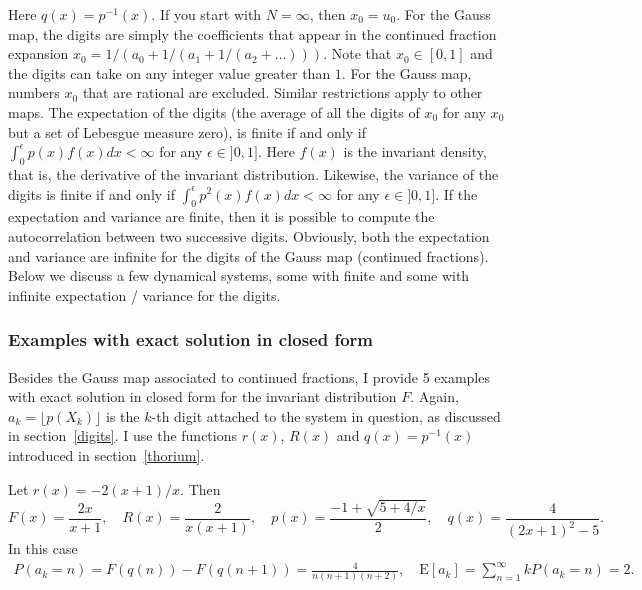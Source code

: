\documentclass[oneside,10pt]{book}
\begin{document}
Here $q(x)=p^{-1}(x)$. If you start with $N=\infty$, then $x_0=u_0$. For the \textcolor{index}{Gauss map}, the digits are simply the coefficients that appear in the continued fraction expansion $x_0=1/(a_0+1/(a_1+1/(a_2+\dots)))$. Note that $x_0\in[0,1]$ and the digits can take on any integer value greater than $1$. For the Gauss map, numbers $x_0$ that are rational are excluded. Similar restrictions apply to other maps. The expectation of the digits (the average of all the digits of $x_0$ for any $x_0$ but a set of Lebesgue measure zero), is finite if and only if $\int_0^\epsilon p(x)f(x)dx<\infty$ for any $\epsilon\in ]0,1]$. Here $f(x)$ is the invariant density, that is, the derivative of the invariant distribution. Likewise, the variance of the digits is finite if and only if $\int_0^\epsilon p^2(x)f(x)dx<\infty$ for any $\epsilon\in ]0,1]$. If the expectation and variance are finite, then it is possible to compute the autocorrelation between two successive digits. Obviously, both the expectation and variance are infinite for the digits of the Gauss map (continued fractions). Below we discuss a few dynamical systems, some with finite and some with infinite expectation / variance for the digits.

\subsubsection{Examples with exact solution in closed form}\label{cf4366}

Besides the Gauss map associated to continued fractions, I provide 5 examples with exact solution in closed form for the invariant distribution $F$. Again, $a_k=\lfloor p(X_k)\rfloor$ is the $k$-th digit attached to the system in question, as discussed in section~\ref{digits}. I use the functions 
 $r(x)$, $R(x)$ and $q(x)=p^{-1}(x)$ introduced in section~\ref{thorium}. \vspace{1ex}


\noindent Let $r(x)=-2(x+1)/x$. Then
$$ F(x)=\frac{2x}{x+1}, \quad R(x)=\frac{2}{x(x+1)},\quad p(x)=\frac{-1+\sqrt{5+4/x}}{2}, \quad q(x)=\frac{4}{(2x+1)^2-5}.$$
In this case 
\begin{align}
P(a_k = n)  =F(q(n))-F(q(n+1))=\frac{4}{n(n+1)(n+2)}, \quad
\text{E}[a_k]  =\sum_{n=1}^\infty k P(a_k=n)=2. \nonumber
\end{align}

\end{document}
